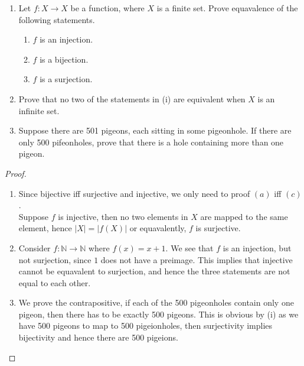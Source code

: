 \documentclass[12pt]{article}
\newenvironment{exercise}[2][Exercise]{\begin{trivlist}
\item[\hskip \labelsep {\bfseries #1}\hskip \labelsep {\bfseries #2.}]}
{\end{trivlist}}
\begin{document}
\begin{exercise}{1.8 (Pigeonhole Principle)}
    \begin{enumerate}

        \item[(i)] Let $f:X\rightarrow X$ be a function, where $X$ is a finite set. Prove equavalence of the following statements.
        \begin{enumerate}
            \item[(a)] $f$ is an injection.
            \item[(b)] $f$ is a bijection.
            \item[(c)] $f$ is a surjection.
        \end{enumerate}

        \item[(ii)] Prove that no two of the statements in (i) are equivalent when $X$ is an infinite set.
        \item[(iii)] Suppose there are 501 pigeons, each sitting in some pigeonhole. If there are only 500 pifeonholes, prove that there is a hole containing more than one pigeon.
    \end{enumerate}
\end{exercise}

\begin{proof}

    \begin{enumerate}
        \item[(i)] Since bijective iff surjective and injective, we only need to proof $(a)$ iff $(c)$. \\
        Suppose $f$ is injective, then no two elements in $X$ are mapped to the same element, hence $|X|=|f(X)|$ or equavalently, $f$ is surjective.

        \item[(ii)] Consider $f:\mathbb{N} \rightarrow \mathbb{N}$ where $f(x)=x+1$. We see that $f$ is an injection, but not surjection, since $1$ does not have a preimage. This implies that injective cannot be equavalent to surjection, and hence the three statements are not equal to each other.
        \item[(iii)] We prove the contrapositive, if each of the 500 pigeonholes contain only one pigeon, then there has to be exactly 500 pigeons. This is obvious by (i) as we have 500 pigeons to map to 500 pigeionholes, then surjectivity implies bijectivity and hence there are 500 pigeions.
    \end{enumerate}

\end{proof}
\end{document}
